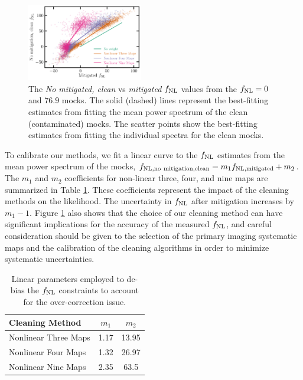 \begin{figure}
\centering
\includegraphics[width=0.45\textwidth]{figures/fnlbias}
\caption{The \textit{No mitigated, clean} vs \textit{mitigated} $f_{\rm NL}$ values from the $f_{\rm NL}=0$ and $76.9$ mocks. The solid (dashed) lines represent the best-fitting estimates from fitting the mean power spectrum of the clean (contaminated) mocks. The scatter points show the best-fitting estimates from fitting the individual spectra for the clean mocks.}\label{fig:fnlbias}
\end{figure}



To calibrate our methods, we fit a linear curve to the $f_{\rm NL}$ estimates from the mean power spectrum of the mocks, $f_{\rm NL, no~mitigation, clean} = m_{1} f_{\rm NL, mitigated} + m_{2}$. The $m_{1}$ and $m_{2}$ coefficients for non-linear three, four, and nine maps are summarized in Table \ref{tab:debiasparams}. These coefficients represent the impact of the cleaning methods on the likelihood. The uncertainty in $f_{\rm NL}$ after mitigation increases by $m_{1}-1$. Figure \ref{fig:fnlbias} also shows that the choice of our cleaning method can have significant implications for the accuracy of the measured $f_{\rm NL}$, and careful consideration should be given to the selection of the primary imaging systematic maps and the calibration of the cleaning algorithms in order to minimize systematic uncertainties.


\begin{table}
\begin{center}
\caption{Linear parameters employed to de-bias the $f_{\rm NL}$ constraints to account for the over-correction issue.}\label{tab:debiasparams}
\begin{tabular}{lcc}
\hline
\hline
\textbf{Cleaning Method} & $m_{1}$ & $m_{2}$ \\
\hline
Nonlinear Three Maps & 1.17 & 13.95 \\
Nonlinear Four Maps & 1.32 & 26.97 \\
Nonlinear Nine Maps & 2.35 & 63.5\\
\hline
\end{tabular}
\end{center}
\end{table}
